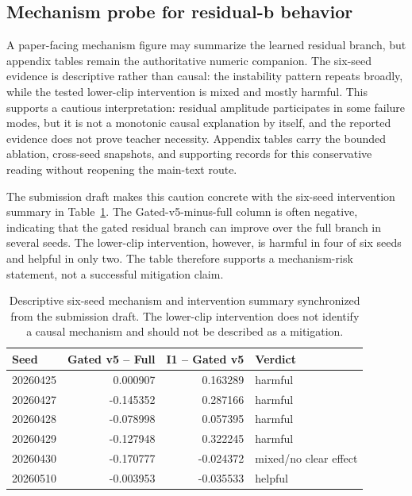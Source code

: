 \documentclass[11pt]{article}
\begin{document}
\subsection{Mechanism probe for residual-b behavior}

A paper-facing mechanism figure may summarize the learned residual branch, but
appendix tables remain the authoritative numeric companion.  The six-seed
evidence is descriptive rather than causal: the instability pattern repeats
broadly, while the tested lower-clip intervention is mixed and mostly harmful.
This supports a cautious interpretation: residual amplitude participates in
some failure modes, but it is not a monotonic causal explanation by itself,
and the reported evidence does not prove teacher necessity.  Appendix tables
carry the bounded ablation, cross-seed snapshots, and supporting records for
this conservative reading without reopening the main-text route.

The submission draft makes this caution concrete with the six-seed
intervention summary in Table~\ref{tab:mechanism-intervention-note}.  The
Gated-v5-minus-full column is often negative, indicating that the gated
residual branch can improve over the full branch in several seeds.  The
lower-clip intervention, however, is harmful in four of six seeds and helpful
in only two.  The table therefore supports a mechanism-risk statement, not a
successful mitigation claim.

\begin{table}[ht]
\centering
\scriptsize
\begin{tabular}{lrrl}
\toprule
Seed & Gated v5 -- Full & I1 -- Gated v5 & Verdict \\
\midrule
20260425 & 0.000907 & 0.163289 & harmful \\
20260427 & -0.145352 & 0.287166 & harmful \\
20260428 & -0.078998 & 0.057395 & harmful \\
20260429 & -0.127948 & 0.322245 & harmful \\
20260430 & -0.170777 & -0.024372 & mixed/no clear effect \\
20260510 & -0.003953 & -0.035533 & helpful \\
\bottomrule
\end{tabular}
\caption{Descriptive six-seed mechanism and intervention summary synchronized
from the submission draft.  The lower-clip intervention does not identify a
causal mechanism and should not be described as a mitigation.}
\label{tab:mechanism-intervention-note}
\end{table}
\end{document}

